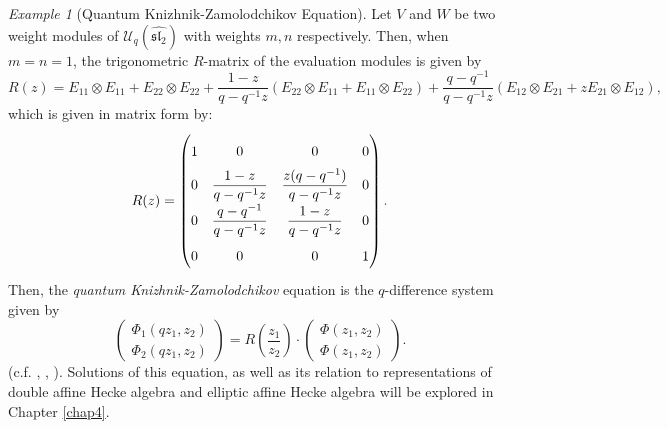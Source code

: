 \documentclass[a4paper]{report}
\theoremstyle{theorem}
\theoremstyle{definition}
\theoremstyle{remark}
\theoremstyle{proposition}
\theoremstyle{conjecture}
\theoremstyle{lemma}
\theoremstyle{corollary}
\theoremstyle{exercise}
\theoremstyle{example}
\newtheorem{example}{Example}
\newcommand{\mcal}{\mathcal}
\begin{document}
  \begin{example}[Quantum Knizhnik-Zamolodchikov Equation]\label{ex_qKZ}
      Let $V$ and $W$ be two weight modules of 
      $\mcal{U}_q(\widehat{\mathfrak{sl}_2})$ with weights $m,n$ respectively. 
      Then, when $m=n=1$,  the trigonometric $R$-matrix of the evaluation modules 
      is given by 
      $$R(z) = E_{11}\otimes E_{11} + E_{22} \otimes E_{22} + \frac{1-z}{q-q^{-1}z} (E_{22}\otimes E_{11} + E_{11}\otimes E_{22}) + \frac{q-q^{-1}}{q-q^{-1}z} (E_{12} \otimes E_{21} + zE_{21}\otimes E_{12}),$$
      which is given in matrix form by:
      $$R(z) = \renewcommand\arraystretch{2}\begin{pmatrix}
          1 & 0 & 0 & 0\\
          0 & \displaystyle\frac{1-z}{q-q^{-1}z} & \displaystyle\frac{z(q-q^{-1})}{q-q^{-1}z} & 0\\
          0 & \displaystyle\frac{q-q^{-1}}{q-q^{-1}z} & \displaystyle\frac{1-z}{q-q^{-1}z} & 0\\
          0 & 0 & 0 & 1
      \end{pmatrix}.$$
      Then, the \emph{quantum Knizhnik-Zamolodchikov} equation is the 
      $q$-difference system given by 
      $$\begin{pmatrix}
          \Phi_1(qz_1,z_2)\\
          \Phi_2(qz_1,z_2) 
          \end{pmatrix} = R\left(\frac{z_1}{z_2}\right) \cdot \begin{pmatrix}
          \Phi(z_1,z_2)\\
          \Phi(z_1,z_2)
      \end{pmatrix}.$$
      (c.f. \cite{efk98}, \cite{fr92}, \cite{sto10}).
      Solutions of this equation, as well as its relation to representations of 
      double affine Hecke algebra and elliptic affine Hecke algebra 
      will be explored in Chapter \ref{chap4}.
  \end{example}
  
\end{document}
